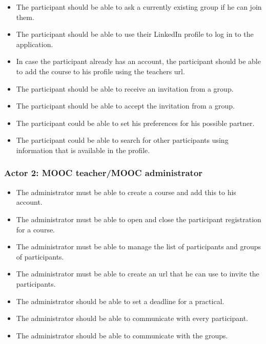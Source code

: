 \begin{itemize}
\item The participant should be able to ask a currently existing group if he can join them.
\item The participant should be able to use their LinkedIn profile to log in to the application.
\item In case the participant already has an account, the participant should be able to add the course to his profile using the teachers url.
\item The participant should be able to receive an invitation from a group.
\item The participant should be able to accept the invitation from a group.
\end{itemize}

\begin{itemize}
\item The participant could be able to set his preferences for his possible partner.
\item The participant could be able to search for other participants using information that is available in the profile.
\end{itemize}



\subsubsection*{Actor 2: MOOC teacher/MOOC administrator}
\begin{itemize}
\item The administrator must be able to create a course and add this to his account.
\item The administrator must be able to open and close the participant registration for a course.
\item The administrator must be able to manage the list of participants and groups of participants.
\item The administrator must be able to create an url that he can use to invite the participants.
\end{itemize}

\begin{itemize}
\item The administrator should be able to set a deadline for a practical.
\item The administrator should be able to communicate with every participant.
\item The administrator should be able to communicate with the groups.
\end{itemize}

